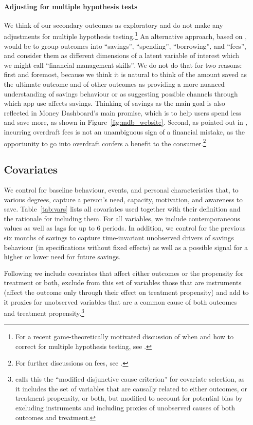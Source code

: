 \paragraph{Adjusting for multiple hypothesis tests}%
\label{par:adjusting_for_multiple_hypothesis_tests}
We think of our secondary outcomes as exploratory and do not make any
adjustments for multiple hypothesis testing.\footnote{For a recent
game-theoretically motivated discussion of when and how to correct for multiple
hypothesis testing, see \citet{viviano2021should}.} An alternative approach,
based on \citet{anderson2008multiple}, would be to group outcomes into
``savings'', ``spending'', ``borrowing'', and ``fees'', and consider them as
different dimensions of a latent variable of interest which we might call
``financial management skills''. We do not do that for two reasons: first and
foremost, because we think it is natural to think of the amount saved as the
ultimate outcome and of other outcomes as providing a more nuanced
understanding of savings behaviour or as suggesting possible channels through
which app use affects savings. Thinking of savings as the main goal is also
reflected in Money Dashboard's main promise, which is to help users spend less
and save more, as shown in Figure~\ref{fig:mdb_website}. Second, as pointed out
in \citet{carlin2017fintech}, incurring overdraft fees is not an unambiguous
sign of a financial mistake, as the opportunity to go into overdraft confers a
benefit to the consumer.\footnote{For further discussions on fees, see
\citet{jorring2020financial, stango2009consumers}.}


\subsection{Covariates}%
\label{sub:covariates}

We control for baseline behaviour, events, and personal characteristics that,
to various degrees, capture a person's need, capacity, motivation, and
awareness to save. Table~\ref{tab:vars} lists all covariates used
together with their definition and the rationale for including them. For all
variables, we include contemporaneous values as well as lags for up to 6
periods. In addition, we control for the previous six months of savings to
capture time-invariant unobserved drivers of savings behaviour (in
specifications without fixed effects) as well as a possible signal for a higher
or lower need for future savings.

Following \citet{vanderweele2019principles} we include covariates that affect
either outcomes or the propensity for treatment or both, exclude from this
set of variables those that are instruments (affect the outcome only through their effect on
treatment propensity) and add to it proxies for unobserved variables that are a
common cause of both outcomes and treatment propensity.\footnote{
\citet{vanderweele2019principles} calls this the ``modified disjunctive cause
criterion'' for covariate selection, as it includes the set of variables that are causally
related to either outcomes, or treatment propensity, or both, but modified to
account for potential bias by excluding instruments and including proxies of
unobserved causes of both outcomes and treatment.}

